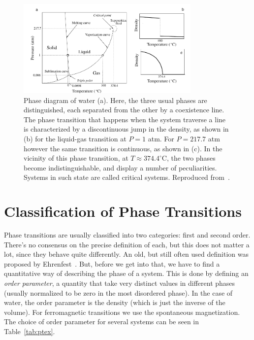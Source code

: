 \begin{figure}[t]
\begin{center}
    \includegraphics[width=0.8\textwidth]{chapters/ch2-crit/figs/water}
\end{center}
\caption{Phase diagram of water (a). Here, the three usual phases are
    distinguished, each separated from the other by a coexistence line. The
    phase transition that happens when the system traverse a line is
    characterized by a discontinuous jump in the density, as shown in (b) for
    the liquid-gas transition at $P=1$ atm. For $P=217.7$ atm however the same
    transition is continuous, as shown in (c). In the vicinity of this phase
    transition, at $T\approx374.4^\circ$C, the two phases become
    indistinguishable, and display a number of peculiarities. Systems in such
    state are called critical systems. Reproduced from~\cite{Sole2011}.}
\label{fig:water}
\end{figure}


\section{Classification of Phase Transitions}
\label{sec:classification}

Phase transitions are usually classified into two categories: first and second
order. There's no consensus on the precise definition of each, but this does
not matter a lot, since they behave quite differently. An old, but still often
used definition was proposed by Ehrenfest~\cite{Jaeger1998}. But, before we get
into that, we have to find a quantitative way of describing the phase of a
system. This is done by defining an \textit{order parameter}, a quantity that
take very distinct values in different phases (usually normalized to be zero in
the most disordered phase). In the case of water, the order parameter is the
density (which is just the inverse of the volume). For ferromagnetic
transitions we use the spontaneous magnetization. The choice of order parameter
for several systems can be seen in Table~\ref{tab:ptex}.

